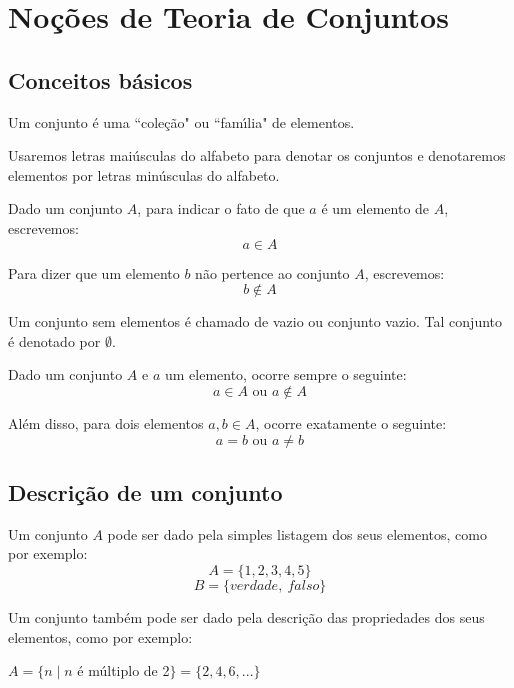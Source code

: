 \chapter{No{\c c}{\~o}es de Teoria de Conjuntos}
\section{Conceitos b{\'a}sicos}

Um conjunto {\'e} uma ``cole{\c c}{\~a}o" ou ``fam{\'\i}lia" de elementos.

Usaremos letras mai{\'u}sculas do alfabeto para denotar os conjuntos e denotaremos elementos por letras min{\'u}sculas do alfabeto.

Dado um conjunto $A$, para indicar o fato de que $a$ {\'e} um elemento de $A$, escrevemos:
\[a \in A\]

Para dizer que um elemento $b$ n{\~a}o pertence ao conjunto $A$, escrevemos:
\[b \notin A\]

Um conjunto sem elementos {\'e} chamado de vazio ou conjunto vazio. Tal conjunto {\'e} denotado por $\emptyset$.

Dado um conjunto $A$ e $a$ um elemento, ocorre sempre o seguinte:
\[a \in A \mbox{ ou } a \notin A\]

Al{\'e}m disso, para dois elementos $a,b\in A$, ocorre exatamente o seguinte:
\[a=b \mbox{ ou } a\neq b\]

\section{Descri{\c c}{\~a}o de um conjunto}

Um conjunto $A$ pode ser dado pela simples listagem dos seus elementos, como por exemplo:
\[ A= \{1,2,3,4,5\}\]
\[B = \{verdade,\ falso\}\]

Um conjunto tamb{\'e}m pode ser dado pela descri{\c c}{\~a}o das propriedades dos seus elementos, como por exemplo:

$A=\{n \mid n$ {\'e} m{\'u}ltiplo de 2$\}=\{2,4,6,...\}$


